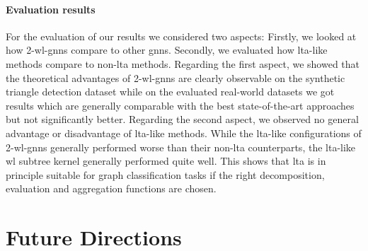 \paragraph{Evaluation results}
For the evaluation of our results we considered two aspects:
Firstly, we looked at how 2-\acs{wl}-\acsp{gnn} compare to other \acp{gnn}.
Secondly, we evaluated how \acs{lta}-like methods compare to non-\acs{lta} methods.
Regarding the first aspect, we showed that the theoretical advantages of 2-\acs{wl}-\acsp{gnn} are clearly observable on the synthetic triangle detection dataset while on the evaluated real-world datasets we got results which are generally comparable with the best state-of-the-art approaches but not significantly better.
Regarding the second aspect, we observed no general advantage or disadvantage of \acs{lta}-like methods.
While the \acs{lta}-like configurations of 2-\acs{wl}-\acsp{gnn} generally performed worse than their non-\ac{lta} counterparts, the \acs{lta}-like \ac{wl} subtree kernel generally performed quite well.
This shows that \ac{lta} is in principle suitable for graph classification tasks if the right decomposition, evaluation and aggregation functions are chosen.

\section{Future Directions}%
\label{sec:conclusion:todo}

